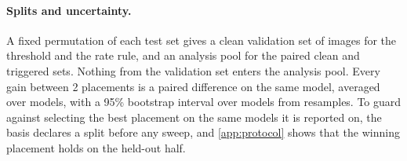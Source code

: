 \paragraph{Splits and uncertainty.}
A fixed permutation of each test set gives a clean validation set of \HeldoutSize{} images for the threshold and the rate rule, and an analysis pool for the paired clean and triggered sets. Nothing from the validation set enters the analysis pool. Every gain between 2 placements is a paired difference on the same model, averaged over models, with a 95\% bootstrap interval \cite{efron1993bootstrap} over models from \BootstrapResamples{} resamples. To guard against selecting the best placement on the same models it is reported on, the basis declares a split before any sweep, and \cref{app:protocol} shows that the winning placement holds on the held-out half.
